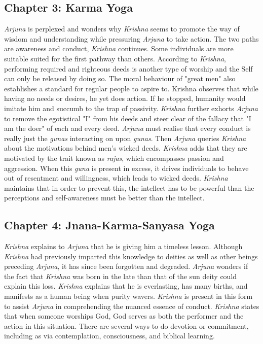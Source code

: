\documentclass[runningheads]{llncs}
\begin{document}
\subsection{Chapter 3: Karma Yoga}
\textit{Arjuna} is perplexed and wonders why \textit{Krishna} seems to promote the way of wisdom and understanding while pressuring \textit{Arjuna} to take action. The two paths are awareness and conduct, \textit{Krishna} continues. Some individuals are more suitable suited for the first pathway than others. According to \textit{Krishna}, performing required and righteous deeds is another type of worship and the Self can only be released by doing so. The moral behaviour of "great men" also establishes a standard for regular people to aspire to. Krishna observes that while having no needs or desires, he yet does action. If he stopped, humanity would imitate him and succumb to the trap of passivity. \textit{Krishna} further exhorts \textit{Arjuna} to remove the egotistical "I" from his deeds and steer clear of the fallacy that "I am the doer" of each and every deed. \textit{Arjuna} must realise that every conduct is really just the \textit{gunas} interacting on upon \textit{gunas}. Then \textit{Arjuna} queries \textit{Krishna} about the motivations behind men's wicked deeds. \textit{Krishna} adds that they are motivated by the trait known as \textit{rajas}, which encompasses passion and aggression. When this \textit{guna} is present in excess, it drives individuals to behave out of resentment and willingness, which leads to wicked deeds. \textit{Krishna} maintains that in order to prevent this, the intellect has to be powerful than the perceptions and self-awareness must be better than the intellect.
\subsection{Chapter 4: Jnana-Karma-Sanyasa Yoga}
\textit{Krishna} explains to \textit{Arjuna} that he is giving him a timeless lesson. Although \textit{Krishna} had previously imparted this knowledge to deities as well as other beings preceding \textit{Arjuna}, it has since been forgotten and degraded. \textit{Arjuna} wonders if the fact that \textit{Krishna} was born in the late than that of the sun deity could explain this loss. \textit{Krishna} explains that he is everlasting, has many births, and manifests as a human being when purity wavers. \textit{Krishna} is present in this form to assist \textit{Arjuna} in comprehending the nuanced essence of conduct. \textit{Krishna} states that when someone worships God, God serves as both the performer and the action in this situation. There are several ways to do devotion or commitment, including as via contemplation, consciousness, and biblical learning.
\end{document}
